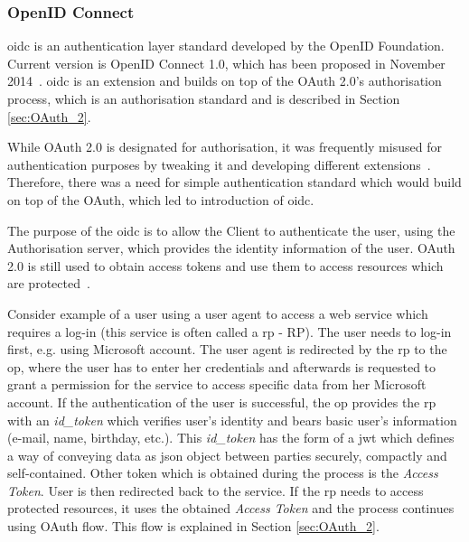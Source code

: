 \subsubsection{OpenID Connect}\label{sec:oidc}

\acrfull{oidc} is an authentication layer standard developed by the OpenID Foundation. Current version is OpenID Connect 1.0, which has been proposed in November 2014~\cite{Sakimura2014Final:1}. \acrshort{oidc} is an extension and builds on top of the OAuth 2.0’s authorisation process, which is an authorisation standard and is described in Section \ref{sec:OAuth_2}. 

While OAuth 2.0 is designated for authorisation, it was frequently misused for authentication purposes by tweaking it and developing different extensions~\cite{RicherUser2.0}. Therefore, there was a need for simple authentication standard which would build on top of the OAuth, which led to introduction of \acrshort{oidc}.

The purpose of the \acrshort{oidc} is to allow the Client to authenticate the user, using the Authorisation server, which provides the identity information of the user. OAuth 2.0 is still used to obtain access tokens and use them to access resources which are protected~\cite{OpenIDSpecs}.

Consider example of a user using a user agent to access a web service which requires a log-in (this service is often called a \acrlong{rp} - RP). The user needs to log-in first, e.g. using Microsoft account. The user agent is redirected by the \acrshort{rp} to the \acrfull{op}, where the user has to enter her credentials and afterwards is requested to grant a permission for the service to access specific data from her Microsoft account. If the authentication of the user is successful, the \acrshort{op} provides the \acrfull{rp} with an \textit{id\_token} which verifies user’s identity and bears basic user’s information (e-mail, name, birthday, etc.). This \textit{id\_token} has the form of a \acrfull{jwt} which defines a way of conveying data as \acrshort{json} object between parties securely, compactly and self-contained. Other token which is obtained during the process is the \textit{Access Token}. User is then redirected back to the service. If the \acrshort{rp} needs to access protected resources, it uses the obtained \textit{Access Token} and the process continues using OAuth flow. This flow is explained in Section \ref{sec:OAuth_2}.